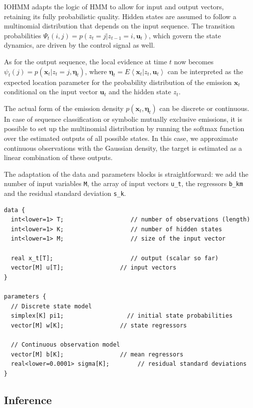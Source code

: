 \documentclass[]{article}
\newcommand\ev[1]{E\left\langle#1\right\rangle}
\newcommand{\mat}[1]{\mathbf{#1}}
\begin{document}
{{{IOHMM adapts the logic of HMM to allow for input and output vectors,
retaining its fully probabilistic quality. Hidden states are assumed to
follow a multinomial distribution that depends on the input sequence.
The transition probabilities
\(\Psi_t(i, j) = p(z_t = j | z_{t-1} = i, \mat{u}_{t})\), which govern
the state dynamics, are driven by the control signal as well.

As for the output sequence, the local evidence at time \(t\) now becomes
\(\psi_t(j) = p(\mat{x}_t | z_t = j, \mat{\eta}_t)\), where
\(\mat{\eta}_t = \ev{\mat{x}_t | z_t, \mat{u}_t}\) can be interpreted as
the expected location parameter for the probability distribution of the
emission \(\mat{x}_{t}\) conditional on the input vector \(\mat{u}_t\)
and the hidden state \(z_t\).

The actual form of the emission density \(p(\mat{x}_t, \mat{\eta}_t)\)
can be discrete or continuous. In case of sequence classification or
symbolic mutually exclusive emissions, it is possible to set up the
multinomial distribution by running the softmax function over the
estimated outputs of all possible states. In this case, we approximate
continuous observations with the Gaussian density, the target is
estimated as a linear combination of these outputs.

The adaptation of the data and parameters blocks is straightforward: we
add the number of input variables \texttt{M}, the array of input vectors
\texttt{u\_t}, the regressors \texttt{b\_km} and the residual standard
deviation \texttt{s\_k}.

\begin{verbatim}
data {
  int<lower=1> T;                   // number of observations (length)
  int<lower=1> K;                   // number of hidden states
  int<lower=1> M;                   // size of the input vector

  real x_t[T];                      // output (scalar so far)
  vector[M] u[T];                // input vectors
}

parameters {
  // Discrete state model
  simplex[K] pi1;                  // initial state probabilities
  vector[M] w[K];                // state regressors

  // Continuous observation model
  vector[M] b[K];                // mean regressors
  real<lower=0.0001> sigma[K];        // residual standard deviations
}
\end{verbatim}

\subsection{Inference}\label{inference-1}

}}}
\end{document}
